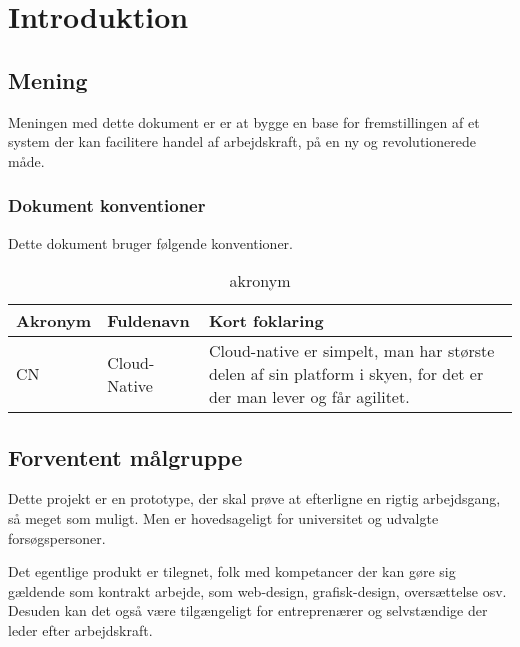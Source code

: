 \chapter{Introduktion}

\section{Mening}

Meningen med dette dokument er er at bygge en base for fremstillingen af et system der kan facilitere handel af arbejdskraft, på en ny og revolutionerede måde.

\subsection{Dokument konventioner}

Dette dokument bruger følgende konventioner.

\begin{table}[H]
    \begin{small}
        \caption{akronym}
        \label{tab:acronym}
        \begin{center}
            \begin{tabular}{l|l|p{10cm}}
                \textbf{Akronym}     & \textbf{Fuldenavn}        & \textbf{Kort foklaring} \\
                \hline
                CN          & Cloud-Native      & Cloud-native er simpelt, man har største delen af sin platform i skyen, for det er der man lever og får agilitet.  \\
            \end{tabular}
        \end{center}
    \end{small}
\end{table}

\section{Forventent målgruppe}

Dette projekt er en prototype, der skal prøve at efterligne en rigtig arbejdsgang, så meget som muligt. Men er hovedsageligt for universitet og udvalgte forsøgspersoner.

Det egentlige produkt er tilegnet, folk med kompetancer der kan gøre sig gældende som kontrakt arbejde, som web-design, grafisk-design, oversættelse osv. Desuden kan det også være tilgængeligt for entreprenærer og selvstændige der leder efter arbejdskraft.

